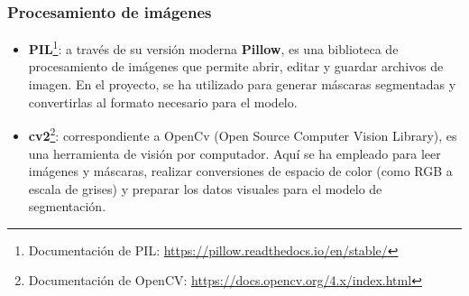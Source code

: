 \subsubsection{Procesamiento de imágenes}
\begin{itemize}
    \item \textbf{PIL}\footnote{Documentación de PIL: \url{https://pillow.readthedocs.io/en/stable/}}: a través de su versión moderna \textbf{Pillow}, es una biblioteca de procesamiento de imágenes que permite abrir, editar y guardar archivos de imagen. En el proyecto, se ha utilizado para generar máscaras segmentadas y convertirlas al formato necesario para el modelo.
    \item \textbf{cv2}\footnote{Documentación de OpenCV: \url{https://docs.opencv.org/4.x/index.html}}: correspondiente a OpenCv (Open Source Computer Vision Library), es una herramienta de visión por computador. Aquí se ha empleado para leer imágenes y máscaras, realizar conversiones de espacio de color (como RGB a escala de grises) y preparar los datos visuales para el modelo de segmentación.
\end{itemize}

